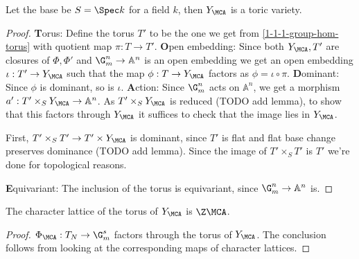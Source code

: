 \begin{proposition}
  \label{1-1-8-aff-tor-var-ya}

  Let the base be $S=\Spec k$ for a field $k$, then $Y_\MCA$ is a toric variety.
\end{proposition}
\begin{proof}

  {\textbf Torus: }
  Define the torus $T'$ to be the one we get from \ref{1-1-1-group-hom-torus} with quotient map $\pi:T \to T'$.
  {\textbf Open embedding: }
  Since both $Y_{\MCA},T'$ are closures of $\Phi,\Phi'$ and $\G_m^n\to\mathbb{A}^n$ is an open embedding
  we get an open embedding $\iota:T' \to Y_{\MCA}$ such that the map $\phi:T \to Y_{\MCA}$ factors as
  $\phi = \iota \circ \pi$.
  {\textbf Dominant: } Since $\phi$ is dominant, so is $\iota$.
  {\textbf Action: }
  Since $\G_m^n$ acts on $\mathbb{A}^n$, we get a morphism $a':T' \times_S Y_\MCA \to \mathbb{A}^n$.
  As $T'\times_S Y_\MCA$ is reduced (TODO add lemma), to show that this factors through $Y_\MCA$ it suffices to check
  that the image lies in $Y_\MCA$.

  First, $T'\times_S T' \to T'\times Y_\MCA$ is dominant, since $T'$ is flat and flat base change preserves dominance (TODO add lemma).
  Since the image of $T'\times_S T'$ is $T'$ we're done for topological reasons.

  {\textbf Equivariant: } The inclusion of the torus is equivariant, since $\G_m^n \to \mathbb{A}^n$ is.
\end{proof}


\begin{proposition}
  \label{1-1-8-char-ya}

  The character lattice of the torus of $Y_\MCA$ is $\Z \MCA$.
\end{proposition}
\begin{proof}

  $\Phi_\MCA: T_N \to \G_m^s$ factors through the torus of $Y_\MCA$.
  The conclusion follows from looking at the corresponding maps of character lattices.
\end{proof}


